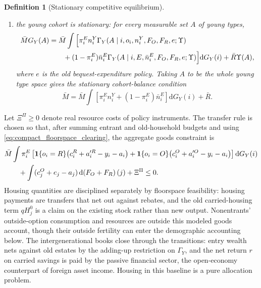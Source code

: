 \documentclass[11pt]{article}
\newtheorem{definition}{Definition}
\newcommand{\dd}{\mathrm d}
\newcommand{\1}{\mathbf 1}
\begin{document}
\begin{definition}[Stationary competitive equilibrium]
\begin{enumerate}
\begin{equation}
F_O(A)
=
\bar M\int
\pi_i^E\1\{o_i=O\}
\Gamma_O(A\mid i,h_i^O,a_i^{\prime O};q,\tau^p)\,
\dd G_Y(i),
\label{eq:compact_old_stationarity}
\end{equation}
and the old-renter measure satisfies the same condition with $\Gamma_R$ and $\1\{o_i=R\}$;
\item the young cohort is stationary: for every measurable set $A$ of young types,
\begin{align}
\bar M G_Y(A)
&=
\bar M\int
\Big[
\pi_i^E n_i^{Y}
\Gamma_Y(A\mid i,o_i,n_i^{Y},F_O,F_R,e;\Upsilon)
\notag\\
&\qquad
+(1-\pi_i^E)\bar n_i^E
\Gamma_Y(A\mid i,E,\bar n_i^E,F_O,F_R,e;\Upsilon)
\Big]\dd G_Y(i)
+
\bar R\Upsilon(A),
\label{eq:compact_young_stationarity}
\end{align}
where $e$ is the old bequest-expenditure policy. Taking $A$ to be the whole young type space gives the stationary cohort-balance condition
\begin{equation}
\bar M
=
\bar M\int
\left[
\pi_i^E n_i^{Y}+(1-\pi_i^E)\bar n_i^E
\right]\dd G_Y(i)
+
\bar R.
\label{eq:compact_cohort_stationarity}
\end{equation}
\end{enumerate}
\end{definition}

Let $\Xi^\Pi\ge0$ denote real resource costs of policy instruments. The transfer rule is chosen so that, after summing entrant and old-household budgets and using \eqref{eq:compact_floorspace_clearing}, the aggregate goods constraint is
\begin{align*}
&\bar M\int
\pi_i^E
\left[
\1\{o_i=R\}\big(c_i^R+a_i^{\prime R}-y_i-a_i\big)
+
\1\{o_i=O\}\big(c_i^O+a_i^{\prime O}-y_i-a_i\big)
\right]\dd G_Y(i)
\notag\\
&\qquad
+
\int(c_j^O+e_j-a_j)\,\dd\!\left(F_O+F_R\right)(j)
+\Xi^\Pi
\le0.
\end{align*}
Housing quantities are disciplined separately by floorspace feasibility: housing payments are transfers that net out against rebates, and the old carried-housing term $q H_j^0$ is a claim on the existing stock rather than new output. Nonentrants' outside-option consumption and resources are outside this modeled goods account, though their outside fertility can enter the demographic accounting below. The intergenerational books close through the transitions: entry wealth nets against old estates by the adding-up restriction on $\Gamma_Y$, and the net return $r$ on carried savings is paid by the passive financial sector, the open-economy counterpart of foreign asset income. Housing in this baseline is a pure allocation problem.
\end{document}
